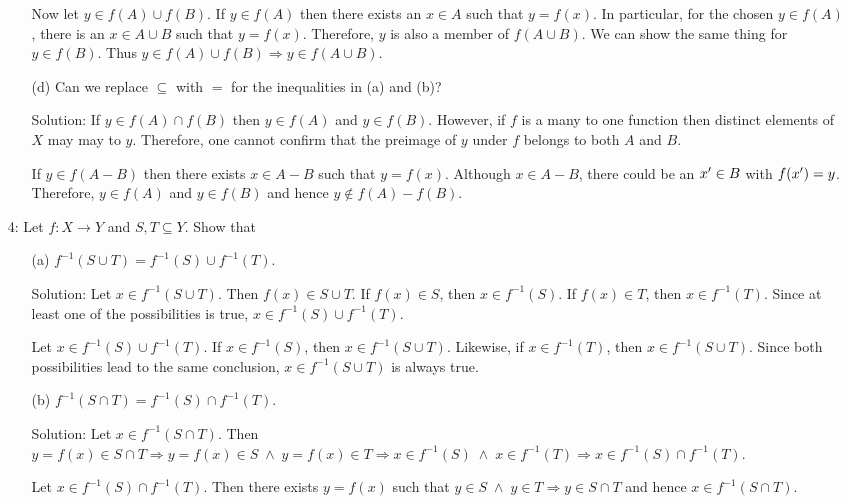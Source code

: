 \begin{enumerate}
\begin{enumerate}
Now let $y \in f(A) \cup f(B)$. If $y \in f(A)$ then there exists an $x
\in A$ such that $y = f(x)$. In particular, for the chosen $y \in f(A)$,
there is an $x \in A \cup B$ such that $y = f(x)$. Therefore, $y$ is also
a member of $f(A \cup B)$. We can show the same thing for $y \in f(B)$.
Thus $y \in f(A) \cup f(B) \Rightarrow y \in f(A \cup B)$.

\item[(d)] Can we replace $\subseteq$ with $=$ for the inequalities in
(a) and (b)?
\item[Solution:] If $y \in f(A) \cap f(B)$ then $y \in f(A)$ and $y \in 
f(B)$. However, if $f$ is a many to one function then distinct elements of 
$X$ may may to $y$. Therefore, one cannot confirm that the preimage of $y$
under $f$ belongs to both $A$ and $B$.

If $y \in f(A - B)$ then there exists $x \in A - B$ such that $y = f(x)$.
Although $x \in A - B$, there could be an $x^\prime \in B$ with $f(x^\prime) = 
y$. Therefore, $y \in f(A)$ and $y \in f(B)$ and hence $y \notin f(A) - 
f(B)$.
\end{enumerate}

\item[4:] Let $f: X \rightarrow Y$ and $S, T \subseteq Y$. Show that
\begin{enumerate}
\item[(a)] $f^{-1}(S \cup T) = f^{-1}(S) \cup f^{-1}(T)$.
\item[Solution:] Let $x \in f^{-1}(S \cup T)$. Then $f(x) \in S \cup T$.
If $f(x) \in S$, then $x \in f^{-1}(S)$. If $f(x) \in T$, then $x \in 
f^{-1}(T)$. Since at least one of the possibilities is true, $x \in f^{-1}
(S) \cup f^{-1}(T)$.

Let $x \in f^{-1}(S) \cup f^{-1}(T)$. If $x \in f^{-1}(S)$, then $x \in
f^{-1}(S \cup T)$. Likewise, if $x \in f^{-1}(T)$, then $x \in f^{-1}(S
\cup T)$. Since both possibilities lead to the same conclusion, $x \in
f^{-1}(S \cup T)$ is always true.

\item[(b)] $f^{-1}(S \cap T) = f^{-1}(S) \cap f^{-1}(T)$.
\item[Solution:] Let $x \in f^{-1}(S \cap T)$. Then $y = f(x) \in S \cap T
\Rightarrow y = f(x) \in S \;\land\; y = f(x) \in T \Rightarrow x \in
f^{-1}(S) \;\land\; x \in f^{-1}(T) \Rightarrow x \in f^{-1}(S) \cap
f^{-1}(T)$.

Let $x \in f^{-1}(S) \cap f^{-1}(T)$. Then there exists $y = f(x)$ such 
that $y \in S \;\land\; y \in T \Rightarrow y \in S \cap T$ and hence $x
\in f^{-1}(S \cap T)$.


\end{enumerate}
\end{enumerate}
